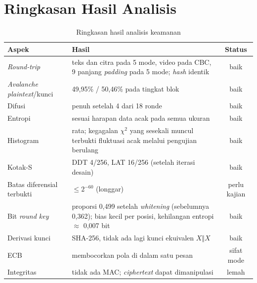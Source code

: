\section{Ringkasan Hasil Analisis}
\begin{table}[H]
    \centering
    \caption{Ringkasan hasil analisis keamanan}
    \label{tab:ringkasan}
    \small
    \begin{tabularx}{\textwidth}{l Y c}
        \toprule
        \textbf{Aspek} & \textbf{Hasil} & \textbf{Status} \\
        \midrule
        \textit{Round-trip} & teks dan citra pada 5 mode, video pada CBC, 9 panjang \textit{padding} pada 5 mode; \textit{hash} identik & baik \\
        \textit{Avalanche} \textit{plaintext}/kunci & 49,95\% / 50,46\% pada tingkat blok & baik \\
        Difusi & penuh setelah 4 dari 18 ronde & baik \\
        Entropi & sesuai harapan data acak pada semua ukuran & baik \\
        Histogram & rata; kegagalan $\chi^2$ yang sesekali muncul terbukti fluktuasi acak melalui pengujian berulang & baik \\
        Kotak-S & DDT 4/256, LAT 16/256 (setelah iterasi desain) & baik \\
        Batas diferensial terbukti & $\leq 2^{-60}$ (longgar) & perlu kajian \\
        Bit \textit{round key} & proporsi 0,499 setelah \textit{whitening} (sebelumnya 0,362); bias kecil per posisi, kehilangan entropi $\approx$ 0,007 bit & baik \\
        Derivasi kunci & SHA-256, tidak ada lagi kunci ekuivalen $X \Vert X$ & baik \\
        ECB & membocorkan pola di dalam satu pesan & sifat mode \\
        Integritas & tidak ada MAC; \textit{ciphertext} dapat dimanipulasi & lemah \\
        \bottomrule
    \end{tabularx}
\end{table}
